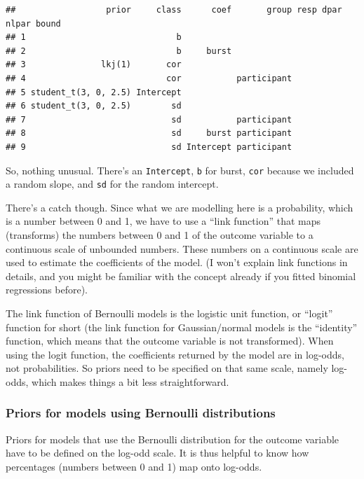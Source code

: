 \documentclass[
]{article}
\begin{document}
\begin{verbatim}
##                  prior     class      coef       group resp dpar nlpar bound
## 1                              b                                            
## 2                              b     burst                                  
## 3               lkj(1)       cor                                            
## 4                            cor           participant                      
## 5 student_t(3, 0, 2.5) Intercept                                            
## 6 student_t(3, 0, 2.5)        sd                                            
## 7                             sd           participant                      
## 8                             sd     burst participant                      
## 9                             sd Intercept participant
\end{verbatim}

So, nothing unusual. There's an \texttt{Intercept}, \texttt{b} for
burst, \texttt{cor} because we included a random slope, and \texttt{sd}
for the random intercept.

There's a catch though. Since what we are modelling here is a
probability, which is a number between 0 and 1, we have to use a ``link
function'' that maps (transforms) the numbers between 0 and 1 of the
outcome variable to a continuous scale of unbounded numbers. These
numbers on a continuous scale are used to estimate the coefficients of
the model. (I won't explain link functions in details, and you might be
familiar with the concept already if you fitted binomial regressions
before).

The link function of Bernoulli models is the logistic unit function, or
``logit'' function for short (the link function for Gaussian/normal
models is the ``identity'' function, which means that the outcome
variable is not transformed). When using the logit function, the
coefficients returned by the model are in log-odds, not probabilities.
So priors need to be specified on that same scale, namely log-odds,
which makes things a bit less straightforward.

\hypertarget{priors-for-models-using-bernoulli-distributions}{%
\subsubsection{Priors for models using Bernoulli
distributions}\label{priors-for-models-using-bernoulli-distributions}}

Priors for models that use the Bernoulli distribution for the outcome
variable have to be defined on the log-odd scale. It is thus helpful to
know how percentages (numbers between 0 and 1) map onto log-odds.
\end{document}
